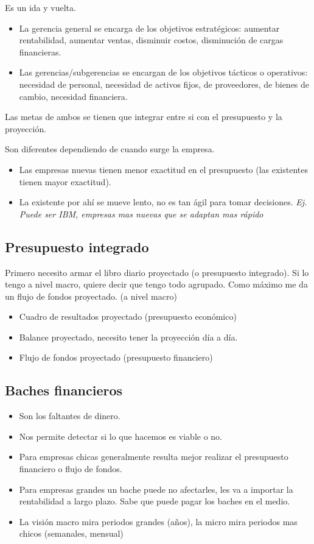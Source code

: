 \documentclass[titlepage,a4paper]{article}
\begin{document}
Es un ida y vuelta.


\begin{itemize}
\item La gerencia general se encarga de los objetivos estratégicos: aumentar rentabilidad, aumentar ventas, disminuir costos, disminución de cargas financieras.
\item Las gerencias/subgerencias se encargan de los objetivos tácticos o operativos: necesidad de personal, necesidad de activos fijos, de proveedores, de bienes de cambio, necesidad financiera.
\end{itemize}

Las metas de ambos se tienen que integrar entre si con el presupuesto y la proyección.

Son diferentes dependiendo de cuando surge la empresa. 
\begin{itemize}
\item Las empresas nuevas tienen menor exactitud en el presupuesto (las existentes tienen mayor exactitud). 
\item La existente por ahí se mueve lento, no es tan ágil para tomar decisiones. \textit{Ej. Puede ser IBM, empresas mas nuevas que se adaptan mas rápido}
\end{itemize}

\subsection*{Presupuesto integrado}
Primero necesito armar el libro diario proyectado (o presupuesto integrado). Si lo tengo a nivel macro, quiere decir que tengo todo agrupado. Como máximo me da un flujo de fondos proyectado. (a nivel macro)
\begin{itemize}
\item Cuadro de resultados proyectado (presupuesto económico)
\item Balance proyectado, necesito tener la proyección día a día.
\item Flujo de fondos proyectado (presupuesto financiero)
\end{itemize}



\subsection{Baches financieros}
\begin{itemize}
\item Son los faltantes de dinero.
\item Nos permite detectar si lo que hacemos es viable o no.
\item Para empresas chicas generalmente resulta mejor realizar el presupuesto financiero o flujo de fondos.
\item Para empresas grandes un bache puede no afectarles, les va a importar la rentabilidad a largo plazo. Sabe que puede pagar los baches en el medio.
\item La visión macro mira periodos grandes (años), la micro mira periodos mas chicos (semanales, mensual)
\end{itemize}
\end{document}
